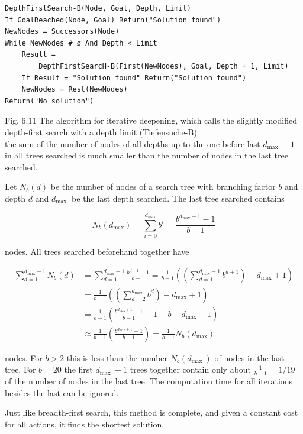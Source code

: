 \documentclass[10pt]{book}
\begin{document}
\begin{verbatim}
DepthFirstSearch-B(Node, Goal, Depth, Limit)
If GoalReached(Node, Goal) Return("Solution found")
NewNodes = Successors(Node)
While NewNodes # ø And Depth < Limit
    Result =
        DepthFirstSearcH-B(First(NewNodes), Goal, Depth + 1, Limit)
    If Result = "Solution found" Return("Solution found")
    NewNodes = Rest(NewNodes)
Return("No solution")
\end{verbatim}

Fig. 6.11 The algorithm for iterative deepening, which calls the slightly modified depth-first search with a depth limit (Tiefensuche-B)\\
the sum of the number of nodes of all depths up to the one before last $d_{\text {max }}-1$ in all trees searched is much smaller than the number of nodes in the last tree searched.

Let $N_{b}(d)$ be the number of nodes of a search tree with branching factor $b$ and depth $d$ and $d_{\text {max }}$ be the last depth searched. The last tree searched contains

$$
N_{b}\left(d_{\max }\right)=\sum_{i=0}^{d_{\max }} b^{i}=\frac{b^{d_{\max }+1}-1}{b-1}
$$

nodes. All trees searched beforehand together have

$$
\begin{aligned}
\sum_{d=1}^{d_{\max }-1} N_{b}(d) & =\sum_{d=1}^{d_{\max }-1} \frac{b^{d+1}-1}{b-1}=\frac{1}{b-1}\left(\left(\sum_{d=1}^{d_{\max }-1} b^{d+1}\right)-d_{\max }+1\right) \\
& =\frac{1}{b-1}\left(\left(\sum_{d=2}^{d_{\max }} b^{d}\right)-d_{\max }+1\right) \\
& =\frac{1}{b-1}\left(\frac{b^{d_{\max }+1}-1}{b-1}-1-b-d_{\max }+1\right) \\
& \approx \frac{1}{b-1}\left(\frac{b^{d_{\max }+1}-1}{b-1}\right)=\frac{1}{b-1} N_{b}\left(d_{\max }\right)
\end{aligned}
$$

nodes. For $b>2$ this is less than the number $N_{b}\left(d_{\text {max }}\right)$ of nodes in the last tree. For $b=20$ the first $d_{\text {max }}-1$ trees together contain only about $\frac{1}{b-1}=1 / 19$ of the number of nodes in the last tree. The computation time for all iterations besides the last can be ignored.

Just like breadth-first search, this method is complete, and given a constant cost for all actions, it finds the shortest solution.
\end{document}
